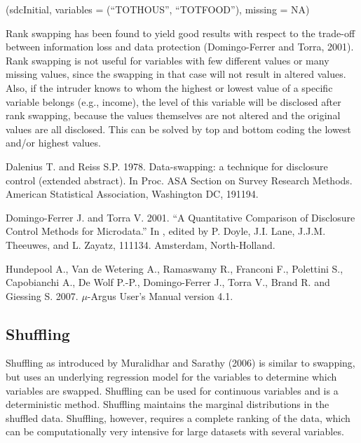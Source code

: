 \documentclass[letterpaper,10pt,english]{sphinxmanual}
\begin{document}
\begin{DUlineblock}{0em}
\item[] 
\item[] (sdcInitial, variables = (“TOTHOUS”, “TOTFOOD”),
missing = NA)
\end{DUlineblock}

Rank swapping has been found to yield good results with respect to the
trade-off between information loss and data protection (Domingo-Ferrer
and Torra, 2001). Rank swapping is not useful for variables with few
different values or many missing values, since the swapping in that case
will not result in altered values. Also, if the intruder knows to whom
the highest or lowest value of a specific variable belongs (e.g.,
income), the level of this variable will be disclosed after rank
swapping, because the values themselves are not altered and the original
values are all disclosed. This can be solved by top and bottom coding
the lowest and/or highest values.


Dalenius T. and Reiss S.P. 1978. Data-swapping: a technique for
disclosure control (extended abstract). In Proc. ASA Section on Survey
Research Methods. American Statistical Association, Washington DC,
191\textendash{}194.

Domingo-Ferrer J. and Torra V. 2001. “A Quantitative Comparison of
Disclosure Control Methods for Microdata.” In , edited by P. Doyle, J.I. Lane, J.J.M. Theeuwes,
and L. Zayatz, 111\textendash{}134. Amsterdam, North-Holland.

Hundepool A., Van de Wetering A., Ramaswamy R., Franconi F., Polettini
S., Capobianchi A., De Wolf P.-P., Domingo-Ferrer J., Torra V., Brand R.
and Giessing S. 2007. \(\mu\)-Argus User’s Manual version 4.1.


\subsection{Shuffling}
\label{\detokenize{anon_methods:shuffling}}
Shuffling as introduced by Muralidhar and Sarathy (2006) is similar to
swapping, but uses an underlying regression model for the variables to
determine which variables are swapped. Shuffling can be used for
continuous variables and is a deterministic method. Shuffling maintains
the marginal distributions in the shuffled data. Shuffling, however,
requires a complete ranking of the data, which can be computationally
very intensive for large datasets with several variables.
\end{document}
